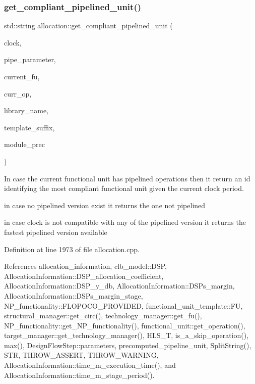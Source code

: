 \subsubsection{\texorpdfstring{get\+\_\+compliant\+\_\+pipelined\+\_\+unit()}{get\_compliant\_pipelined\_unit()}}
{\footnotesize\ttfamily std\+::string allocation\+::get\+\_\+compliant\+\_\+pipelined\+\_\+unit (\begin{DoxyParamCaption}\item[{double}]{clock,  }\item[{const std\+::string \&}]{pipe\+\_\+parameter,  }\item[{const \hyperlink{technology__node_8hpp_a33dd193b7bd6b987bf0d8a770a819fa7}{technology\+\_\+node\+Ref}}]{current\+\_\+fu,  }\item[{const std\+::string \&}]{curr\+\_\+op,  }\item[{const std\+::string \&}]{library\+\_\+name,  }\item[{const std\+::string \&}]{template\+\_\+suffix,  }\item[{unsigned int}]{module\+\_\+prec }\end{DoxyParamCaption})\hspace{0.3cm}{\ttfamily [protected]}}



In case the current functional unit has pipelined operations then it return an id identifying the most compliant functional unit given the current clock period. 

in case no pipelined version exist it returns the one not pipelined

in case clock is not compatible with any of the pipelined version it returns the fastest pipelined version available 

Definition at line 1973 of file allocation.\+cpp.



References allocation\+\_\+information, clb\+\_\+model\+::\+D\+SP, Allocation\+Information\+::\+D\+S\+P\+\_\+allocation\+\_\+coefficient, Allocation\+Information\+::\+D\+S\+P\+\_\+y\+\_\+db, Allocation\+Information\+::\+D\+S\+Ps\+\_\+margin, Allocation\+Information\+::\+D\+S\+Ps\+\_\+margin\+\_\+stage, N\+P\+\_\+functionality\+::\+F\+L\+O\+P\+O\+C\+O\+\_\+\+P\+R\+O\+V\+I\+D\+ED, functional\+\_\+unit\+\_\+template\+::\+FU, structural\+\_\+manager\+::get\+\_\+circ(), technology\+\_\+manager\+::get\+\_\+fu(), N\+P\+\_\+functionality\+::get\+\_\+\+N\+P\+\_\+functionality(), functional\+\_\+unit\+::get\+\_\+operation(), target\+\_\+manager\+::get\+\_\+technology\+\_\+manager(), H\+L\+S\+\_\+T, is\+\_\+a\+\_\+skip\+\_\+operation(), max(), Design\+Flow\+Step\+::parameters, precomputed\+\_\+pipeline\+\_\+unit, Split\+String(), S\+TR, T\+H\+R\+O\+W\+\_\+\+A\+S\+S\+E\+RT, T\+H\+R\+O\+W\+\_\+\+W\+A\+R\+N\+I\+NG, Allocation\+Information\+::time\+\_\+m\+\_\+execution\+\_\+time(), and Allocation\+Information\+::time\+\_\+m\+\_\+stage\+\_\+period().




